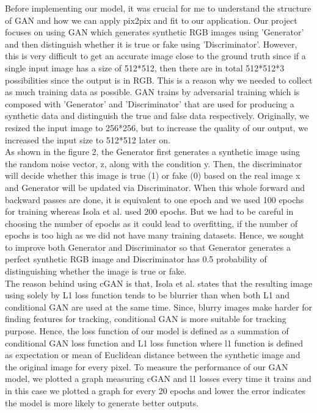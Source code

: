 \documentclass[conference]{IEEEtran}
\begin{document}
Before implementing our model, it was crucial for me to understand the structure of GAN and how we can apply pix2pix and fit to our application. Our project focuses on using GAN which generates synthetic RGB images using 'Generator' and then distinguish whether it is true or fake using 'Discriminator'. However, this is very difficult to get an accurate image close to the ground truth since if a single input image has a size of 512*512, then there are in total 512*512*3 possibilities since the output is in RGB. This is a reason why we needed to collect as much training data as possible. GAN trains by adversarial training which is composed with ’Generator’ and ’Discriminator’ that are used for producing a synthetic data and distinguish the true and false data respectively. Originally, we resized the input image to 256*256, but to increase the quality of our output, we increased the input size to 512*512 later on. \\
As shown in the figure 2, the Generator first generates a synthetic image using the random noise vector, z, along with the condition y. Then, the discriminator will decide whether this image is true (1) or fake (0) based on the real image x and Generator will be updated via Discriminator. When this whole forward and backward passes are done, it is equivalent to one epoch and we used 100 epochs for training whereas Isola et al. \cite{b1} used 200 epochs. But we had to be careful in choosing the number of epochs as it could lead to overfitting, if the number of epochs is too high as we did not have many training datasets. Hence, we sought to improve both Generator and Discriminator so that Generator generates a perfect synthetic RGB image and Discriminator has 0.5 probability of distinguishing whether the image is true or fake.\\

The reason behind using cGAN is that, Isola et al. \cite{b1} states that the resulting image using solely by L1 loss function tends to be blurrier than when both L1 and conditional GAN are used at the same time. Since, blurry images make harder for finding features for tracking, conditional GAN is more suitable for tracking purpose. Hence, the loss function of our model is defined as a summation of conditional GAN loss function and L1 loss function where l1 function is defined as expectation or mean of Euclidean distance between the synthetic image and the original image for every pixel. To measure the performance of our GAN model, we plotted a graph measuring cGAN and l1 losses every time it trains and in this case we plotted a graph for every 20 epochs and lower the error indicates the model is more likely to generate better outputs.  \\
\end{document}
